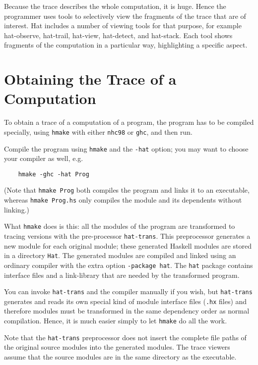 \documentclass[12pt]{article}
\begin{document}
Because the trace describes the whole computation, it is huge.
Hence the programmer uses tools to selectively view the fragments of
the trace that are of interest.  Hat includes a number of
viewing tools for that purpose, for example 
hat-observe, hat-trail, hat-view, hat-detect, and hat-stack.
Each tool shows fragments of the computation in a particular way,
highlighting a specific aspect.



\section{Obtaining the Trace of a Computation}

To obtain a trace of a computation of a program, the program has to
be compiled specially, using \texttt{hmake} with either \texttt{nhc98}
or \texttt{ghc}, and then run.

Compile the program using \texttt{hmake} and the \texttt{-hat} option;
you may want to choose your compiler as well, e.g.
\begin{verbatim}
    hmake -ghc -hat Prog
\end{verbatim}
(Note that \texttt{hmake Prog} both compiles the program and links
it to an executable, whereas \texttt{hmake Prog.hs} only compiles
the module and its dependents without linking.)

What \texttt{hmake} does is this: all the modules of the
program are transformed to tracing versions with the pre-processor
\texttt{hat-trans}.  This preprocessor generates a new module for each original module; these generated Haskell modules are stored in a directory 
\texttt{Hat}.  The generated modules
are compiled and linked using an ordinary compiler with the extra
option \texttt{-package hat}.  The \texttt{hat} package contains
interface files and a link-library that are needed by the transformed
program.

You can invoke \texttt{hat-trans} and the compiler manually if you
wish, but \texttt{hat-trans} generates and reads its own special kind
of module interface files (\texttt{.hx} files) and therefore modules
must be transformed in the same dependency order as normal compilation.
Hence, it is much easier simply to let \texttt{hmake} do all the work.

Note that the \texttt{hat-trans} preprocessor does not insert the
complete file paths of the original source modules into the generated
modules. The trace viewers assume that the source modules are in the
same directory as the executable.
\end{document}
